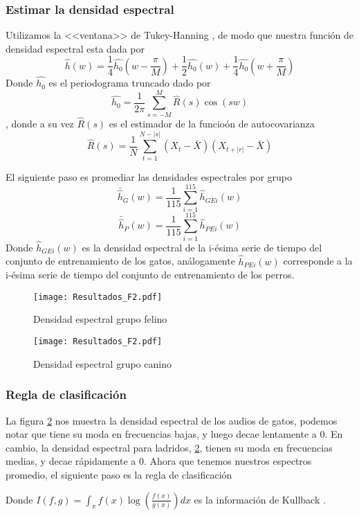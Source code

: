 \documentclass[twocolumn,10pt]{asme2ej}
\begin{document}
\subsubsection*{Estimar la densidad espectral} %
\label{ssub:estimar_la_densidad_espectral}
Utilizamos la <<ventana>> de Tukey-Hanning \cite{PRIESTLEY}, de modo que nuestra funci\'on de densidad espectral esta dada por
$$\hat{h}(w)=\frac{1}{4}\hat{h_0}\left(w-\frac{\pi}{M}\right)+\frac{1}{2}\hat{h_0}\left(w\right)+\frac{1}{4}\hat{h_0}\left(w+\frac{\pi}{M}\right)$$
Donde $\hat{h_0}$ es el periodograma truncado dado por 
$$\hat{h_0}=\frac{1}{2\pi}\sum^{M}_{s=-M}\hat{R}(s)\cos(sw)$$, donde a su vez $\hat{R}(s)$ es el estimador de la funcio\'on de autocovarianza
$$\hat{R}(s)=\frac{1}{N}\sum^{N-|s|}_{t=1}(X_t-\bar{X})(X_{t+|r|}-\bar{X})$$

El siguiente paso es promediar las densidades espectrales por grupo 
$$
\bar{\hat{h}}_G(w)=\frac{1}{115}\sum_{i=1}^{115}\hat{h}_{GEi}(w)
$$
$$
\bar{\hat{h}}_P(w)=\frac{1}{115}\sum_{i=1}^{115}\hat{h}_{PEi}(w)
$$
Donde $\hat{h}_{GEi}(w)$ es la densidad espectral de la i-\'esima serie de tiempo del conjunto de entrenamiento de los gatos, an\'alogamente $\hat{h}_{PEi}(w)$ corresponde a la i-\'esima serie de tiempo del conjunto de entrenamiento de los perros.
\begin{figure}[h]
  \centering
    \texttt{[image: Resultados\_F2.pdf]}
  \caption{Densidad espectral grupo felino}
  \label{plot:de_g1}
\end{figure}
\begin{figure}[h]
  \centering
    \texttt{[image: Resultados\_F2.pdf]}
  \caption{Densidad espectral grupo canino}
  \label{plot:de_p1}
\end{figure}
\subsubsection*{Regla de clasificaci\'on} %
\label{ssub:regla_de_clasificacion}
La figura \ref{plot:de_p1} nos muestra la densidad espectral de los audios de gatos, podemos notar que tiene su moda en frecuencias bajas, y luego decae lentamente a 0. En cambio, la densidad espectral para ladridos, \ref{plot:de_p1}, tienen su moda en frecuencias medias, y decae r\'apidamente a 0. Ahora que tenemos nuestros espectros promedio, el siguiente paso es la regla de clasificaci\'on


Donde $I(f, g)=\int_x f(x)\log(\frac{f(x)}{g(x)})dx$ es la informaci\'on de Kullback \cite{KULLBACK_2}. 
\end{document}
